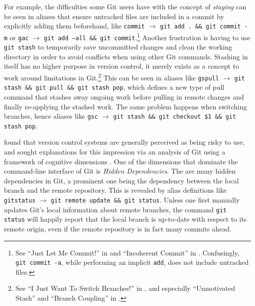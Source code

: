 \documentclass[smallextended,natbib]{svjour3}
\newcommand{\alias}[2]{{\texttt{#1} $\rightarrow$ \texttt{#2}}}
\begin{document}
For example, the difficulties some Git users have with the concept of \emph{staging} can be seen in aliases that ensure untracked files are included in a commit by explicitly adding them beforehand, like \alias{commit}{git add . \&\& git commit -m} or \alias{gac}{git add --all \&\& git commit}.\footnote{See ``Just Let Me Commit!'' in \cite{perez:13} and ``Incoherent Commit'' in \cite{perez:16}. Confusingly, \texttt{git commit -a}, while performing an implicit \texttt{add}, does not include untracked files.} Another frustration is having to use \texttt{git stash} to temporarily save uncommitted changes and clean the working directory in order to avoid conflicts when using other Git commands.
Stashing in itself has no higher purpose in version control, it merely exists as a concept to work around limitations in Git.\footnote{See ``I Just Want To Switch Branches!'' in \cite{perez:13}, and especially ``Unmotivated Stash'' and ``Branch Coupling'' in \cite{perez:16}.}
This can be seen in aliases like \alias{gspull}{git stash \&\& git pull \&\& git stash pop}, which defines a new type of pull command that stashes away ongoing work before pulling in remote changes and finally re-applying the stashed work.
The same problem happens when switching branches, hence aliases like \alias{gsc}{git stash \&\& git checkout \$1 \&\& git stash pop}.

\cite{church:14} found that version control systems are generally perceived as being risky to use, and sought explanations for this impression via an analysis of Git using a framework of cognitive dimensions \citep{green:96}.
One of the dimensions that dominate the command-line interface of Git is \emph{Hidden Dependencies}.
The are many hidden dependencies in Git, a prominent one being the dependency between the local branch and the remote repository.
This is revealed by alias definitions like \alias{gitstatus}{git remote update \&\& git status}.
Unless one first manually updates Git's local information about remote branches, the command \texttt{git status} will happily report that the local branch is up-to-date with respect to its remote origin, even if the remote repository is in fact many commits ahead.
\end{document}
